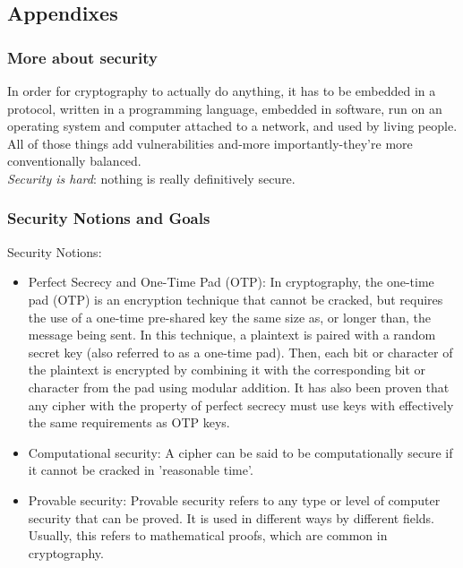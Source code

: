 \documentclass{article}
\begin{document}
\subsection{Appendixes}
\subsubsection{More about security}
In order for cryptography to actually do anything, it has to be embedded in a protocol, written in a programming language, embedded in software, run on an operating system and computer attached to a network, and used by living people. All of those things add vulnerabilities and-more importantly-they’re more conventionally balanced.\\

\textit{Security is hard}: nothing is really definitively secure.\\

\subsubsection{Security Notions and Goals}
Security Notions:
\begin{itemize}
    \item Perfect Secrecy and One-Time Pad (OTP): In cryptography, the one-time pad (OTP) is an encryption technique that cannot be cracked, but requires the use of a one-time pre-shared key the same size as, or longer than, the message being sent. In this technique, a plaintext is paired with a random secret key (also referred to as a one-time pad). Then, each bit or character of the plaintext is encrypted by combining it with the corresponding bit or character from the pad using modular addition.
    It has also been proven that any cipher with the property of perfect secrecy must use keys with effectively the same requirements as OTP keys.
    \item Computational security: A cipher can be said to be computationally secure if it cannot be cracked in 'reasonable time'.
    \item Provable security: Provable security refers to any type or level of computer security that can be proved. It is used in different ways by different fields.
    Usually, this refers to mathematical proofs, which are common in cryptography. \\
\end{itemize}
\end{document}
